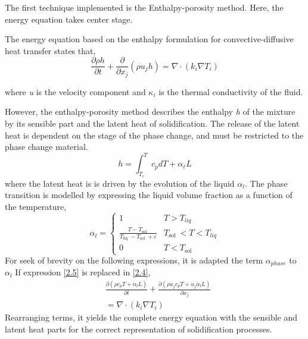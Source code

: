 \setlength{\parindent}{0.5cm} The first technique implemented is the Enthalpy-porosity method. Here, the energy equation takes center stage. 

\noindent The energy equation based on the enthalpy formulation for convective-diffusive heat transfer states that,
\begin{equation}
	\frac{\partial \rho h}{\partial t}+\frac{\partial}{\partial x_{j}}\left(\rho u_{j} h\right)=\nabla \cdot\left(k_{i} \nabla T_{i}\right)
	\label{2.3}
\end{equation}

\noindent where \textit{u} is the velocity component and $\kappa_{i}$ is the thermal conductivity of the fluid.

\noindent However, the enthalpy-porosity method describes the enthalpy \textit{h} of the mixture by its sensible part and the latent heat of solidification.
The release of the latent heat is dependent on the stage of the phase change, and must be restricted to the phase change material.
\begin{equation}
	h=\int_{T_{r}}^{T} c_{p} d T+\alpha_{\ell} L
	\label{2.4}
\end{equation}
where the latent heat is is driven by the evolution of the liquid $\alpha_{l}$. The phase transition is modelled by expressing the liquid volume fraction as a function of the temperature,
\begin{equation}
	\alpha_{l}= \begin{cases}
		1 & T>T_{l i q} \\ \frac{T-T_{\text {sol }}}{T_{\text {liq }}-T_{\text {sol }}+\varepsilon} & T_{\text {sol }}<T<T_{l i q} \\ 0 & T<T_{\text {sol }}
	\end{cases}
	\label{2.5}
\end{equation}
For seek of brevity on the following expressions, it is adapted the term $\alpha_{phase}$ to $\alpha_{l}$ 
If expression \ref{2.5} is replaced in \ref{2.4},
\begin{equation}
	\begin{aligned}
		&\frac{\partial\left(\rho c_{p} T + \alpha_{l} L\right)}{\partial t}+\frac{\partial\left(\rho u_{j} c_{p} T + u_{j} \alpha_{l} L\right)}{\partial x_{j}} \\
		&=\nabla \cdot\left(k_{i} \nabla T_{i}\right)
	\end{aligned}
	\label{2.6}
\end{equation}
Rearranging terms, it yields the complete energy equation with the sensible and latent heat parts for the correct representation of solidification processes.
